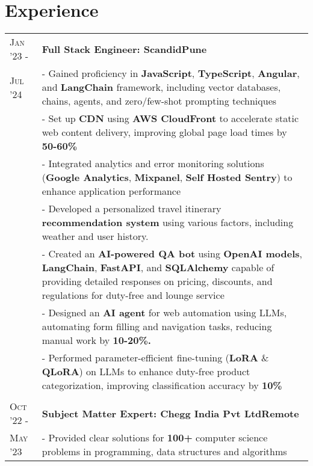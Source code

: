 \documentclass[a4paper,10pt]{extarticle}
\begin{document}
\vspace{+0.2cm}
\section{\textcolor{primary}{Experience}}
\vspace{+0.1cm}

\begin{tabularx}{\linewidth}{l|X}
\textsc{Jan '23 -} & \textbf{Full Stack Engineer: Scandid}\hfill\textbf{Pune}\\
\textsc{Jul '24} & {- Gained proficiency in \textbf{JavaScript}, \textbf{TypeScript}, \textbf{Angular}, and \textbf{LangChain} framework, including vector databases, chains, agents, and zero/few-shot prompting techniques}\\
& {- Set up \textbf{CDN} using \textbf{AWS CloudFront} to accelerate static web content delivery, improving global page load times by \textbf{50-60\%}}\\
& {- Integrated analytics and error monitoring solutions (\textbf{Google Analytics}, \textbf{Mixpanel}, \textbf{Self Hosted Sentry}) to enhance application performance}\\
& {- Developed a personalized travel itinerary \textbf{recommendation system} using various factors, including weather and user history.}\\
& {- Created an \textbf{AI-powered QA bot} using \textbf{OpenAI models}, \textbf{LangChain}, \textbf{FastAPI}, and \textbf{SQLAlchemy}} capable of providing detailed responses on pricing, discounts, and regulations for duty-free and lounge service\\
& {- Designed an \textbf{AI agent} for web automation using LLMs, automating form filling and navigation tasks, reducing manual work by \textbf{10-20\%.}}\\
& {- Performed parameter-efficient fine-tuning (\textbf{LoRA} \& \textbf{QLoRA}) on LLMs to enhance duty-free product categorization, improving classification accuracy by \textbf{10\%}}\\

\multicolumn{2}{c}{} \\

\textsc{Oct '22 -} & \textbf{Subject Matter Expert: Chegg India Pvt Ltd}\hfill\textbf{Remote}\\
\textsc{May '23} & {- Provided clear solutions for \textbf{100+} computer science problems in programming, data structures and algorithms}\\
\end{tabularx}
\end{document}
